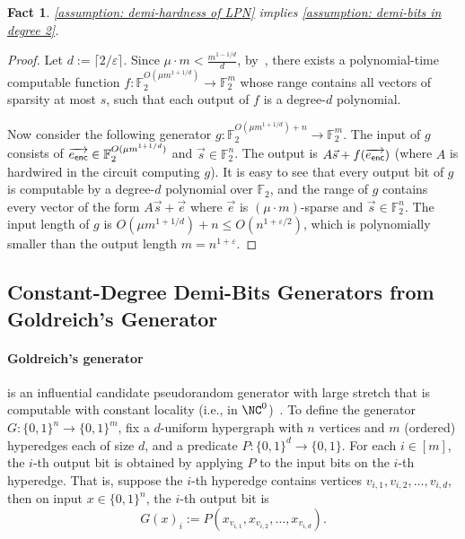 \documentclass[10pt,a4paper]{article}
\newtheorem{fact}[theorem]{Fact}
\theoremstyle{definition}
\theoremstyle{remark}
\newcommand{\eps}{\varepsilon}
\newcommand{\F}{\mathbb{F}}
\begin{document}
\begin{fact}
    \autoref{assumption: demi-hardness of LPN} implies \autoref{assumption: demi-bits in degree 2}.
\end{fact}
\begin{proof}
    Let $d := \lceil 2/\eps\rceil$. Since $\mu\cdot m < \frac{m^{1-1/d}}{d}$, by~\cite[Lemma 3.1]{GajulapalliGNS23}, there exists a polynomial-time computable function $f: \F_2^{O(\mu m^{1+1/d})} \to \F_2^m$ whose range contains all vectors of sparsity at most $s$, such that each output of $f$ is a degree-$d$ polynomial.
    
    Now consider the following generator $g: \F_2^{O(\mu m^{1+1/d}) + n}\to \F_2^m$. The input of $g$ consists of $\overrightarrow{e_{\sf enc}} \in \F_2^{O(\mu m^{1+1/d})}$ and $\vec{s} \in \F_2^n$. The output is $A\vec{s} + f(\overrightarrow{e_{\sf enc}})$ (where $A$ is hardwired in the circuit computing $g$). It is easy to see that every output bit of $g$ is computable by a degree-$d$ polynomial over $\F_2$, and the range of $g$ contains every vector of the form $A\vec{s} + \vec{e}$ where $\vec{e}$ is $(\mu\cdot m)$-sparse and $\vec{s} \in \F_2^n$. The input length of $g$ is $O(\mu m^{1+1/d}) + n \le O(n^{1+\eps/2})$, which is polynomially smaller than the output length $m = n^{1+\eps}$.
\end{proof}

\subsection{Constant-Degree Demi-Bits Generators from Goldreich's Generator}

\paragraph{Goldreich's generator} is an influential candidate pseudorandom generator with large stretch that is computable with constant locality (i.e., in $\NC^0$)~\cite{Goldreich11-PRG}. To define the generator $G: \{0, 1\}^n \to \{0, 1\}^m$, fix a $d$-uniform hypergraph with $n$ vertices and $m$ (ordered) hyperedges each of size $d$, and a predicate $P: \{0, 1\}^d \to \{0, 1\}$. For each $i\in[m]$, the $i$-th output bit is obtained by applying $P$ to the input bits on the $i$-th hyperedge. That is, suppose the $i$-th hyperedge contains vertices $v_{i, 1}, v_{i, 2}, \dots, v_{i, d}$, then on input $x \in \{0, 1\}^n$, the $i$-th output bit is
\[G(x)_i := P(x_{v_{i, 1}}, x_{v_{i, 2}}, \dots, x_{v_{i, d}}).\]
\end{document}
